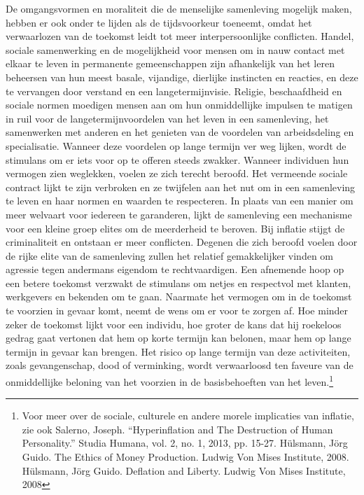 De omgangsvormen en moraliteit die de menselijke samenleving mogelijk maken, hebben er ook onder te lijden als de tijdsvoorkeur toeneemt, omdat het verwaarlozen van de toekomst leidt tot meer interpersoonlijke conflicten. Handel, sociale samenwerking en de mogelijkheid voor mensen om in nauw contact met elkaar te leven in permanente gemeenschappen zijn afhankelijk van het leren beheersen van hun meest basale, vijandige, dierlijke instincten en reacties, en deze te vervangen door verstand en een langetermijnvisie. Religie, beschaafdheid en sociale normen moedigen mensen aan om hun onmiddellijke impulsen te matigen in ruil voor de langetermijnvoordelen van het leven in een samenleving, het samenwerken met anderen en het genieten van de voordelen van arbeidsdeling en specialisatie. Wanneer deze voordelen op lange termijn ver weg lijken, wordt de stimulans om er iets voor op te offeren steeds zwakker. Wanneer individuen hun vermogen zien weglekken, voelen ze zich terecht beroofd. Het vermeende sociale contract lijkt te zijn verbroken en ze twijfelen aan het nut om in een samenleving te leven en haar normen en waarden te respecteren. In plaats van een manier om meer welvaart voor iedereen te garanderen, lijkt de samenleving een mechanisme voor een kleine groep elites om de meerderheid te beroven. Bij inflatie stijgt de criminaliteit en ontstaan er meer conflicten.\autocite{153} Degenen die zich beroofd voelen door de rijke elite van de samenleving zullen het relatief gemakkelijker vinden om agressie tegen andermans eigendom te rechtvaardigen. Een afnemende hoop op een betere toekomst verzwakt de stimulans om netjes en respectvol met klanten, werkgevers en bekenden om te gaan. Naarmate het vermogen om in de toekomst te voorzien in gevaar komt, neemt de wens om er voor te zorgen af. Hoe minder zeker de toekomst lijkt voor een individu, hoe groter de kans dat hij roekeloos gedrag gaat vertonen dat hem op korte termijn kan belonen, maar hem op lange termijn in gevaar kan brengen. Het risico op lange termijn van deze activiteiten, zoals gevangenschap, dood of verminking, wordt verwaarloosd ten faveure van de onmiddellijke beloning van het voorzien in de basisbehoeften van het leven.\footnote{Voor meer over de sociale, culturele en andere morele implicaties van inflatie, zie ook Salerno, Joseph. “Hyperinflation and The Destruction of Human Personality.” Studia Humana, vol. 2, no. 1, 2013, pp. 15-27. Hülsmann, Jörg Guido. The Ethics of Money Production. Ludwig Von Mises Institute, 2008. Hülsmann, Jörg Guido. Deflation and Liberty. Ludwig Von Mises Institute, 2008}


